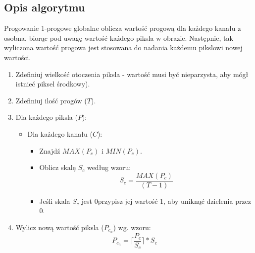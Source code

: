 \documentclass[a4paper,12pt, titlepage]{report}
\begin{document}
\subsection*{Opis algorytmu}
\par Progowanie 1-progowe globalne oblicza wartość progową dla każdego kanału z osobna, biorąc pod uwagę wartość każdego piksla w obrazie. Następnie, tak wyliczona wartość progowa jest stosowana do nadania każdemu pikslowi nowej wartości.
\begin{enumerate}
\item Zdefiniuj wielkość otoczenia piksla - wartość musi być nieparzysta, aby mógł istnieć piksel środkowy).
\item Zdefiniuj ilość progów (\(T\)).
\item Dla każdego piksla (\(P\)):
\begin{itemize}
\item Dla każdego kanału (\(C\)):
\begin{itemize}
\item Znajdź \(MAX(P_{c})\) i \(MIN(P_{c})\).
\item Oblicz skalę \(S_{c}\) według wzoru: \[S_{c}=\frac{MAX(P_{c})}{(T-1)}\]
\item Jeśli skala \(S_{c}\) jest 0przypisz jej wartość 1, aby uniknąć dzielenia przez 0.
\end{itemize}
\end{itemize}
\item Wylicz nową wartość piksla (\(P_{c_{n}}\)) wg. wzoru: \[P_{c_{n}}=\Big\lceil\frac{P_{c}}{S_{c}}\Big\rceil*S_{c}\]
\end{enumerate}
\end{document}
